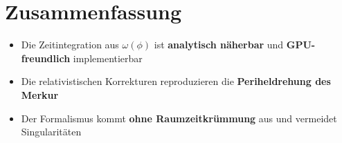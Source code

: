 \section{Zusammenfassung}
\begin{itemize}
\item Die Zeitintegration aus $\omega(\phi)$ ist \textbf{analytisch näherbar} und \textbf{GPU-freundlich} implementierbar
\item Die relativistischen Korrekturen reproduzieren die \textbf{Periheldrehung des Merkur}
\item Der Formalismus kommt \textbf{ohne Raumzeitkrümmung} aus und vermeidet Singularitäten
\end{itemize}